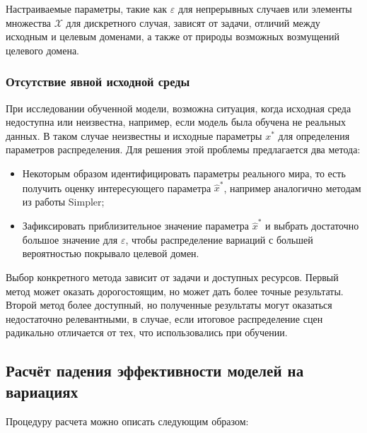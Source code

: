             Настраиваемые параметры, такие как $\varepsilon$ для непрерывных случаев или элементы множества $\mathcal{X}$ для дискретного случая, зависят от задачи, отличий между исходным и целевым доменами, а также от природы возможных возмущений целевого домена. 
       
        \subsubsection{Отсутствие явной исходной среды}
            
            При исследовании обученной модели, возможна ситуация, когда исходная среда недоступна или неизвестна, например, если модель была обучена не реальных данных. В таком случае неизвестны и исходные параметры $x^*$ для определения параметров распределения. Для решения этой проблемы предлагается два метода:

            \begin{itemize}
                \item Некоторым образом идентифицировать параметры реального мира, то есть получить оценку интересующего параметра $\hat{x}^*$, например аналогично методам из работы Simpler;
                \item Зафиксировать приблизительное значение параметра $\hat{x}^*$ и выбрать достаточно большое значение для $\varepsilon$, чтобы распределение вариаций с большей вероятностью покрывало целевой домен.
            \end{itemize}

            Выбор конкретного метода зависит от задачи и доступных ресурсов. Первый метод может оказать дорогостоящим, но может дать более точные результаты. Второй метод более доступный, но полученные результаты могут оказаться недостаточно релевантными, в случае, если итоговое распределение сцен радикально отличается от тех, что использовались при обучении. 

    \subsection{Расчёт падения эффективности моделей на вариациях}
         \label{method_robust}
        
        Процедуру расчета можно описать следующим образом:

